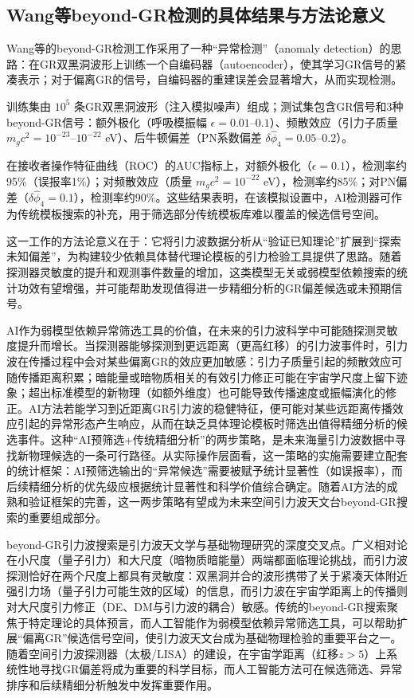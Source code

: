 \subsection{Wang等beyond-GR检测的具体结果与方法论意义}

Wang等的beyond-GR检测工作采用了一种“异常检测”（anomaly detection）的思路：在GR双黑洞波形上训练一个自编码器（autoencoder），使其学习GR信号的紧凑表示；对于偏离GR的信号，自编码器的重建误差会显著增大，从而实现检测。

训练集由 $10^5$ 条GR双黑洞波形（注入模拟噪声）组成；测试集包含GR信号和3种beyond-GR信号：额外极化（呼吸模振幅 $\epsilon = 0.01$--$0.1$）、频散效应（引力子质量 $m_g c^2 = 10^{-23}$--$10^{-22}$ eV）、后牛顿偏差（PN系数偏差 $\delta\hat{\phi}_4 = 0.05$--$0.2$）。

在接收者操作特征曲线（ROC）的AUC指标上，对额外极化（$\epsilon=0.1$），检测率约95\%（误报率1\%）；对频散效应（质量 $m_g c^2 = 10^{-22}$ eV），检测率约85\%；对PN偏差（$\delta\hat{\phi}_4 = 0.1$），检测率约90\%。这些结果表明，在该模拟设置中，AI检测器可作为传统模板搜索的补充，用于筛选部分传统模板库难以覆盖的候选信号空间。

这一工作的方法论意义在于：它将引力波数据分析从“验证已知理论”扩展到“探索未知偏差”，为构建较少依赖具体替代理论模板的引力检验工具提供了思路。随着探测器灵敏度的提升和观测事件数量的增加，这类模型无关或弱模型依赖搜索的统计功效有望增强，并可能帮助发现值得进一步精细分析的GR偏差候选或未预期信号。

AI作为弱模型依赖异常筛选工具的价值，在未来的引力波科学中可能随探测灵敏度提升而增长。当探测器能够探测到更远距离（更高红移）的引力波事件时，引力波在传播过程中会对某些偏离GR的效应更加敏感：引力子质量引起的频散效应可随传播距离积累；暗能量或暗物质相关的有效引力修正可能在宇宙学尺度上留下迹象；超出标准模型的新物理（如额外维度）也可能导致传播速度或振幅演化的修正。AI方法若能学习到近距离GR引力波的稳健特征，便可能对某些远距离传播效应引起的异常形态产生响应，从而在缺乏具体理论模板时筛选出值得精细分析的候选事件。这种“AI预筛选+传统精细分析”的两步策略，是未来海量引力波数据中寻找新物理候选的一条可行路径。从实际操作层面看，这一策略的实施需要建立配套的统计框架：AI预筛选输出的“异常候选”需要被赋予统计显著性（如误报率），而后续精细分析的优先级应根据统计显著性和科学价值综合确定。随着AI方法的成熟和验证框架的完善，这一两步策略有望成为未来空间引力波天文台beyond-GR搜索的重要组成部分。

beyond-GR引力波搜索是引力波天文学与基础物理研究的深度交叉点。广义相对论在小尺度（量子引力）和大尺度（暗物质暗能量）两端都面临理论挑战，而引力波探测恰好在两个尺度上都具有灵敏度：双黑洞并合的波形携带了关于紧凑天体附近强引力场（量子引力可能生效的区域）的信息，而引力波在宇宙学距离上的传播则对大尺度引力修正（DE、DM与引力波的耦合）敏感。传统的beyond-GR搜索聚焦于特定理论的具体预言，而人工智能作为弱模型依赖异常筛选工具，可以帮助扩展“偏离GR”候选信号空间，使引力波天文台成为基础物理检验的重要平台之一。随着空间引力波探测器（太极/LISA）的建设，在宇宙学距离（红移$z>5$）上系统性地寻找GR偏差将成为重要的科学目标，而人工智能方法可在候选筛选、异常排序和后续精细分析触发中发挥重要作用。

